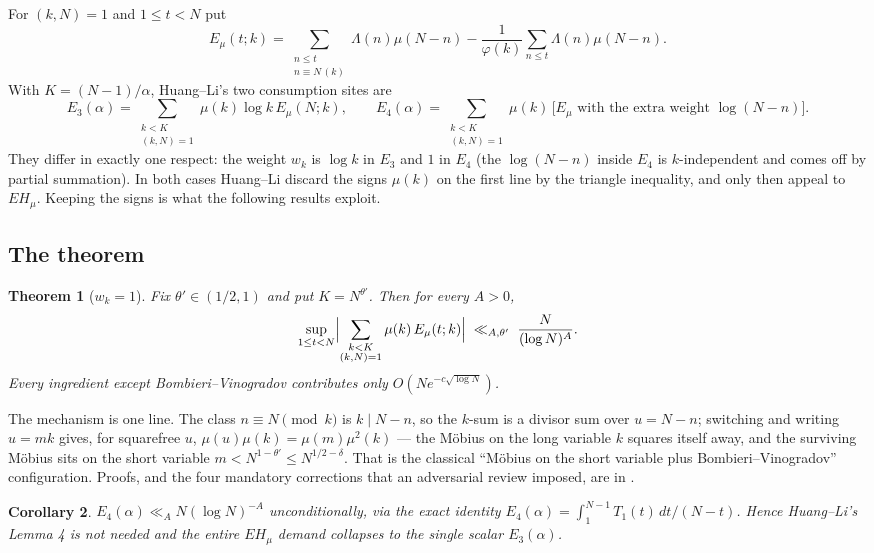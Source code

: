 \documentclass[11pt,a4paper]{article}
\theoremstyle{plain}
\newtheorem{theorem}{Theorem}
\newtheorem{corollary}[theorem]{Corollary}
\theoremstyle{definition}
\begin{document}
For $(k,N)=1$ and $1\le t<N$ put
\[
  E_\mu(t;k) = \sum_{\substack{n\le t\\ n\equiv N\,(k)}}
    \Lambda(n)\mu(N-n) - \frac{1}{\varphi(k)}\sum_{n\le t}
    \Lambda(n)\mu(N-n).
\]
With $K = (N-1)/\alpha$, Huang--Li's two consumption sites are
\[
  E_3(\alpha)=\!\!\sum_{\substack{k<K\\(k,N)=1}}\!\!\mu(k)\log k\,
  E_\mu(N;k),
  \qquad
  E_4(\alpha)=\!\!\sum_{\substack{k<K\\(k,N)=1}}\!\!\mu(k)\,
  \bigl[\text{$E_\mu$ with the extra weight }\log(N-n)\bigr].
\]
They differ in exactly one respect: the weight $w_k$ is $\log k$ in
$E_3$ and $1$ in $E_4$ (the $\log(N-n)$ inside $E_4$ is
$k$-independent and comes off by partial summation). In both cases
Huang--Li discard the signs $\mu(k)$ on the first line by the triangle
inequality, and only then appeal to $EH_\mu$. Keeping the signs is
what the following results exploit.

\subsection{The theorem}

\begin{theorem}[$w_k = 1$]\label{thm:A}
Fix $\theta' \in (1/2,1)$ and put $K = N^{\theta'}$. Then for every
$A>0$,
\[
  \sup_{1\le t<N}\Bigl|
   \sum_{\substack{k<K\\(k,N)=1}}\mu(k)\,E_\mu(t;k)\Bigr|
  \;\ll_{A,\theta'}\; \frac{N}{(\log N)^A}.
\]
Every ingredient except Bombieri--Vinogradov contributes only
$O(Ne^{-c\sqrt{\log N}})$.
\end{theorem}

The mechanism is one line. The class $n \equiv N \pmod k$ is
$k \mid N-n$, so the $k$-sum is a divisor sum over $u = N-n$;
switching and writing $u = mk$ gives, for squarefree $u$,
$\mu(u)\mu(k) = \mu(m)\mu^2(k)$ --- the M\"obius on the long variable
$k$ squares itself away, and the surviving M\"obius sits on the short
variable $m < N^{1-\theta'} \le N^{1/2-\delta}$. That is the classical
``M\"obius on the short variable plus Bombieri--Vinogradov''
configuration. Proofs, and the four mandatory corrections that an
adversarial review imposed, are in \cite{ThmA}.

\begin{corollary}\label{cor:B}
$E_4(\alpha) \ll_A N(\log N)^{-A}$ unconditionally, via the exact
identity $E_4(\alpha) = \int_1^{N-1} T_1(t)\,dt/(N-t)$. Hence
Huang--Li's Lemma 4 is not needed and the entire $EH_\mu$ demand
collapses to the single scalar $E_3(\alpha)$.
\end{corollary}
\end{document}

